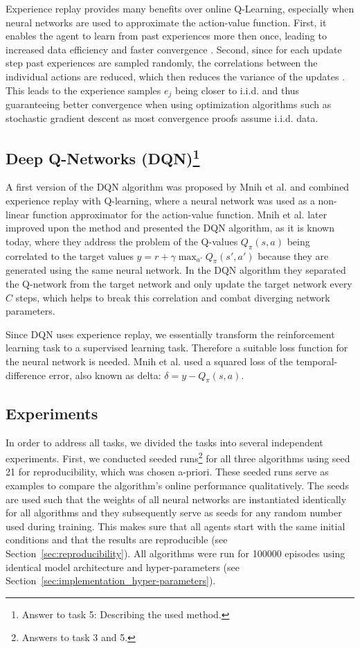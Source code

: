 \documentclass[conference]{IEEEtran}
\begin{document}
Experience replay provides many benefits over online Q-Learning, especially when neural networks are used to approximate the action-value function. 
First, it enables the agent to learn from past experiences more then once, leading to increased data efficiency and faster convergence \cite{lin1992, atari2013}. Second, since for each update step past experiences are sampled randomly, the correlations between the individual actions are reduced, which then reduces the variance of the updates \cite{atari2013}. This leads to the experience samples $e_j$ being closer to i.i.d. and thus guaranteeing better convergence when using optimization algorithms such as stochastic gradient descent as most convergence proofs assume i.i.d. data.



\subsection{Deep Q-Networks (DQN)\footnote{Answer to task 5: Describing the used method.}}

A first version of the DQN algorithm was proposed by Mnih et al. \cite{atari2013} and combined experience replay with Q-learning, where a neural network was used as a non-linear function approximator for the action-value function. Mnih et al. \cite{dqn2015} later improved upon the method and presented the DQN algorithm, as it is known today, where they address the problem of the Q-values $Q_\pi(s,a)$ being correlated to the target values $y = r+\gamma \max_{a'} Q_\pi(s',a')$ because they are generated using the same neural network. In the DQN algorithm they separated the Q-network from the target network and only update the target network every $C$ steps, which helps to break this correlation and combat diverging network parameters. 

Since DQN uses experience replay, we essentially transform the reinforcement learning task to a supervised learning task. Therefore a suitable loss function for the neural network is needed. Mnih et al. \cite{dqn2015} used a squared loss of the temporal-difference error, also known as delta: $\delta = y - Q_\pi (s,a)$.


\subsection{Experiments}

In order to address all tasks, we divided the tasks into several independent experiments. First, we conducted seeded runs\footnote{Answers to task 3 and 5.} for all three algorithms using seed 21 for reproducibility, which was chosen a-priori. These seeded runs serve as examples to compare the algorithm's online performance qualitatively. The seeds are used such that the weights of all neural networks are instantiated identically for all algorithms and they subsequently serve as seeds for any random number used during training. This makes sure that all agents start with the same initial conditions and that the results are reproducible (see Section~\ref{sec:reproducibility}). All algorithms were run for 100000 episodes using identical model architecture and hyper-parameters (see Section~\ref{sec:implementation_hyper-parameters}).
\end{document}
